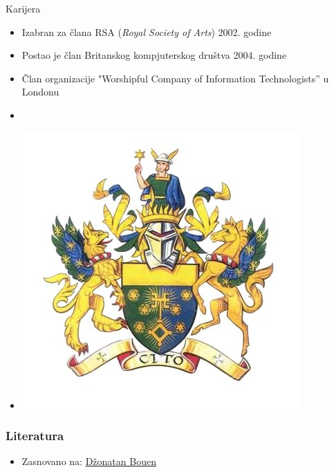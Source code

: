 \documentclass{beamer}
\begin{document}
\begin{frame}{Karijera}

    \begin{itemize}
    
    		\item Izabran za člana RSA (\textit{Royal Society of Arts}) 2002. godine
    
    		\item Postao je član Britanskog kompjuterskog društva 2004. godine
    
    		\item Član organizacije "Worshipful Company of Information Technologists” u Londonu
    
    		\item[]
    
    		\item[] \begin{center} \includegraphics[scale=0.25]{7Nb1Hw2A_400x400.jpg} \end{center}
    \end{itemize}

\end{frame}

\begin{frame}[fragile]\frametitle{Literatura}

	\begin{itemize}

		\item Zasnovano na: \href {https://sr.wikipedia.org/wiki/%D0%8F%D0%BE%D0%BD%D0%B0%D1%82%D0%B0%D0%BD_%D0%91%D0%BE%D1%83%D0%B5%D0%BD} {Džonatan Bouen}

	\end{itemize}

\end{frame}
\end{document}
